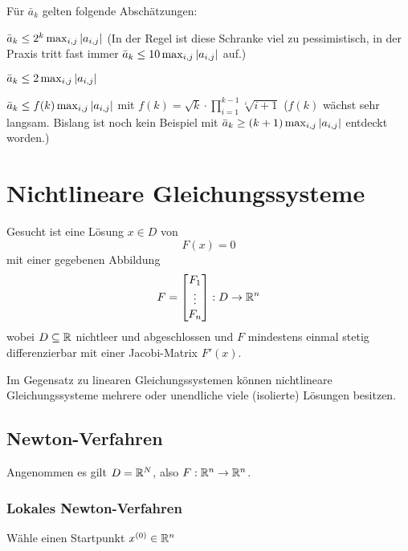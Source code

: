 			Für \( \bar{a}_k \) gelten folgende Abschätzungen:
			\begin{description}[leftmargin = 5cm]
				\item[Spaltenpivotsuche] \( \bar{a}_k \leq 2^k \max_{i,j} \abs{a_{i,j}} \) (In der Regel ist diese Schranke viel zu pessimistisch, in der Praxis tritt fast immer \( \bar{a}_k \leq 10 \max_{i,j} \abs{a_{i,j}} \) auf.)
				\item[Spaltenpivotsuche (bei Tridiagonalmatrizen)] \( \bar{a}_k \leq 2 \max_{i,j} \abs{a_{i,j}} \)
				\item[Vollständige Pivotsuche] \( \bar{a}_k \leq f(k) \max_{i,j} \abs{a_{i,j}} \) mit \( f(k) = \sqrt{k} \cdot \prod_{i = 1}^{k - 1} \sqrt[i]{i + 1} \) (\(f(k)\) wächst sehr langsam. Bislang ist noch kein Beispiel mit \( \bar{a}_k \geq (k + 1) \max_{i,j} \abs{a_{i,j}} \) entdeckt worden.)
			\end{description}

\chapter{Nichtlineare Gleichungssysteme}
	Gesucht ist eine Lösung \( x \in D \) von \[ F(x) = 0 \] mit einer gegebenen Abbildung
	\begin{equation*}
		F =
		\begin{bmatrix}
			F_1    \\
			\vdots \\
			F_n
		\end{bmatrix}
		: D \rightarrow \mathbb{R}^n
	\end{equation*}
	wobei \( D \subseteq \mathbb{R} \) nichtleer und abgeschlossen und \(F\) mindestens einmal stetig differenzierbar mit einer Jacobi-Matrix \(F'(x)\).

	Im Gegensatz zu linearen Gleichungssystemen können nichtlineare Gleichungssysteme mehrere oder unendliche viele (isolierte) Lösungen besitzen.

	\section{Newton-Verfahren}
		Angenommen es gilt \( D = \mathbb{R}^N \), also \( F : \mathbb{R}^n \rightarrow \mathbb{R}^n \).

		\subsection{Lokales Newton-Verfahren}
			\begin{algorithm}[H]
				Wähle einen Startpunkt \( x^{(0)} \in \mathbb{R}^n \) \\
			\end{algorithm}

